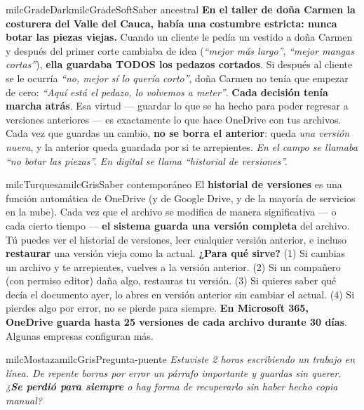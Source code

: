 \documentclass[11pt,letterpaper]{article}
\begin{document}
\begin{softbox}{milcGradeDark}{milcGradeSoft}{Saber ancestral}
\textbf{En el taller de doña Carmen la costurera del Valle del Cauca, había una costumbre estricta: nunca botar las piezas viejas.} Cuando un cliente le pedía un vestido a doña Carmen y después del primer corte cambiaba de idea (\emph{``mejor más largo''}, \emph{``mejor mangas cortas''}), \textbf{ella guardaba TODOS los pedazos cortados}. Si después al cliente se le ocurría \emph{``no, mejor sí lo quería corto''}, doña Carmen no tenía que empezar de cero: \emph{``Aquí está el pedazo, lo volvemos a meter''}. \textbf{Cada decisión tenía marcha atrás}. Esa virtud --- guardar lo que se ha hecho para poder regresar a versiones anteriores --- es exactamente lo que hace OneDrive con tus archivos. Cada vez que guardas un cambio, \textbf{no se borra el anterior}: queda \emph{una versión nueva}, y la anterior queda guardada por si te arrepientes. \emph{En el campo se llamaba ``no botar las piezas''. En digital se llama ``historial de versiones''.}
\end{softbox}

\begin{softbox}{milcTurquesa}{milcGris}{Saber contemporáneo}
El \textbf{historial de versiones} es una función automática de OneDrive (y de Google Drive, y de la mayoría de servicios en la nube). Cada vez que el archivo se modifica de manera significativa --- o cada cierto tiempo --- \textbf{el sistema guarda una versión completa} del archivo. Tú puedes ver el historial de versiones, leer cualquier versión anterior, e incluso \textbf{restaurar} una versión vieja como la actual. \textbf{¿Para qué sirve?} (1) Si cambias un archivo y te arrepientes, vuelves a la versión anterior. (2) Si un compañero (con permiso editor) daña algo, restauras tu versión. (3) Si quieres saber qué decía el documento ayer, lo abres en versión anterior sin cambiar el actual. (4) Si pierdes algo por error, no se pierde para siempre. \textbf{En Microsoft 365, OneDrive guarda hasta 25 versiones de cada archivo durante 30 días}. Algunas empresas configuran más.
\end{softbox}

\begin{softbox}{milcMostaza}{milcGris}{Pregunta-puente}
\textit{Estuviste 2 horas escribiendo un trabajo en línea. De repente borras por error un párrafo importante y guardas sin querer. ¿\textbf{Se perdió para siempre} o hay forma de recuperarlo sin haber hecho copia manual?}
\end{softbox}
\end{document}
